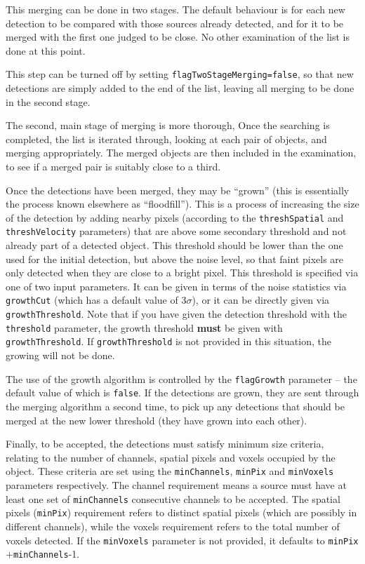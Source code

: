
This merging can be done in two stages. The default behaviour is for
each new detection to be compared with those sources already detected,
and for it to be merged with the first one judged to be close. No
other examination of the list is done at this point.

This step can be turned off by setting
\texttt{flagTwoStageMerging=false}, so that new detections are simply
added to the end of the list, leaving all merging to be done in the
second stage.

The second, main stage of merging is more thorough, Once the searching
is completed, the list is iterated through, looking at each pair of
objects, and merging appropriately. The merged objects are then
included in the examination, to see if a merged pair is suitably close
to a third.


Once the detections have been merged, they may be ``grown'' (this is
essentially the process known elsewhere as ``floodfill''). This is a
process of increasing the size of the detection by adding nearby
pixels (according to the \texttt{threshSpatial} and
\texttt{threshVelocity} parameters) that are above some secondary
threshold and not already part of a detected object. This threshold
should be lower than the one used for the initial detection, but above
the noise level, so that faint pixels are only detected when they are
close to a bright pixel. This threshold is specified via one of two
input parameters. It can be given in terms of the noise statistics via
\texttt{growthCut} (which has a default value of $3\sigma$), or it can
be directly given via \texttt{growthThreshold}. Note that if you have
given the detection threshold with the \texttt{threshold} parameter,
the growth threshold \textbf{must} be given with
\texttt{growthThreshold}. If \texttt{growthThreshold} is not provided
in this situation, the growing will not be done.

The use of the growth algorithm is controlled by the
\texttt{flagGrowth} parameter -- the default value of which is
\texttt{false}. If the detections are grown, they are sent through the
merging algorithm a second time, to pick up any detections that should
be merged at the new lower threshold (\ie they have grown into each
other). 

\label{sec-reject}

Finally, to be accepted, the detections must satisfy minimum size
criteria, relating to the number of channels, spatial pixels and
voxels occupied by the object. These criteria are set using the
\texttt{minChannels}, \texttt{minPix} and \texttt{minVoxels}
parameters respectively. The channel requirement means a source must
have at least one set of \texttt{minChannels} consecutive channels to
be accepted. The spatial pixels (\texttt{minPix}) requirement refers
to distinct spatial pixels (which are possibly in different channels),
while the voxels requirement refers to the total number of voxels
detected. If the \texttt{minVoxels} parameter is not provided, it
defaults to \texttt{minPix}$+$\texttt{minChannels}-1.

